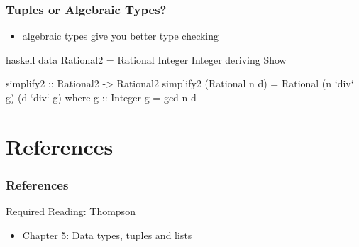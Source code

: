 \documentclass[dvipsnames]{beamer}
\theoremstyle{plain}
\begin{document}
\begin{frame}[fragile]
  \frametitle{Tuples or Algebraic Types?}

  \begin{itemize}
    \item algebraic types give you better type checking
  \end{itemize}

  \begin{exampleblock}{}
    \begin{pygments}{haskell}
data Rational2 = Rational Integer Integer
                 deriving Show

simplify2 :: Rational2 -> Rational2
simplify2 (Rational n d) =
  Rational (n `div` g) (d `div` g)
    where
      g :: Integer
      g = gcd n d
    \end{pygments}
  \end{exampleblock}
\end{frame}

\section*{References}

\begin{frame}
  \frametitle{References}

  \begin{block}{Required Reading: Thompson}
    \begin{itemize}
      \item Chapter 5: \alert{Data types, tuples and lists}
    \end{itemize}
  \end{block}
\end{frame}
\end{document}
